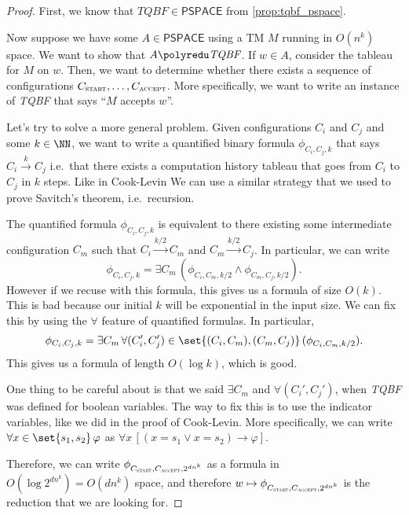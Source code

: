 \documentclass{standalone}
\begin{document}
\begin{proof}
	First, we know that \(\textit{TQBF} \in \mathsf{PSPACE}\) from \cref{prop:tqbf_pspace}.
	
	Now suppose we have some \(A \in \mathsf{PSPACE}\) using a \textsf{TM} \(M\) running in \(O(n^k)\) space. We want to show that \(A \polyredu \textit{TQBF}\). If \(w \in A\), consider the tableau for \(M\) on \(w\). Then, we want to determine whether there exists a sequence of configurations \(C_{\textsc{start}}, \dots, C_{\textsc{accept}}\). More specifically, we want to write an instance of \textit{TQBF} that says ``\(M\) accepts \(w\)''.

	Let's try to solve a more general problem. Given configurations \(C_i\) and \(C_j\) and some \(k \in \NN\), we want to write a quantified binary formula \(\phi_{C_i, C_j, k}\) that says \(C_i \stackrel{k}{\to} C_j\) i.e.\ that there exists a computation history tableau that goes from \(C_i\) to \(C_j\) in \(k\) steps. Like in Cook-Levin We can use a similar strategy that we used to prove Savitch's theorem, i.e.\ recursion.

	The quantified formula \(\phi_{C_i, C_j, k}\) is equivalent to there existing some intermediate configuration \(C_m\) such that \(C_i \xrightarrow{k/2} C_m\) and \(C_m \xrightarrow{k/2} C_j\). In particular, we can write
	\[
		\phi_{C_i, C_j, k} =
			\exists C_m \, (
				\phi_{C_i, C_m, k/2} \land
				\phi_{C_m, C_j, k/2}
			).
	\]
	However if we recuse with this formula, this gives us a formula of size \(O(k)\). This is bad because our initial \(k\) will be exponential in the input size. We can fix this by using the \(\forall\) feature of quantified formulas. In particular,
	\[
		\phi_{C_i, C_j, k} =
			\exists C_m \, \forall (C_i', C_j') \in \set{(C_i, C_m), (C_m, C_j)} \, (
				\phi_{C_i, C_m, k/2}
			).
	\]
	This gives us a formula of length \(O(\log k)\), which is good.

	One thing to be careful about is that we said \(\exists C_m\) and \(\forall(C_i', C_j')\), when \textit{TQBF} was defined for boolean variables. The way to fix this is to use the indicator variables, like we did in the proof of Cook-Levin. More specifically, we can write \(\forall x \in \set{s_1, s_2}\, \varphi\) as \(\forall x \, [(x = s_1 \lor x = s_2) \rightarrow \varphi]\).

	Therefore, we can write \(\phi_{C_{\textsc{start}}, C_{\textsc{accept}}, 2^{d n^k}}\) as a formula in \(O(\log 2^{d n^k}) = O(d n^k)\) space, and therefore \(w \mapsto \phi_{C_{\textsc{start}}, C_{\textsc{accept}}, 2^{d n^k}}\) is the reduction that we are looking for.
\end{proof}
\end{document}
